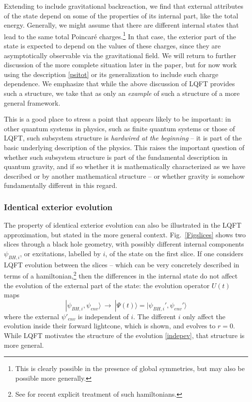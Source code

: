 \documentclass[11pt]{article}
\numberwithin{equation}{section}
\newcommand{\beq}{\begin{equation}}
\newcommand{\eeq}{\end{equation}}
\begin{document}
Extending to include gravitational backreaction, we find that external attributes of the state depend on some of the properties of its internal part, like the total energy.  Generally, we might assume that there are different internal states that lead to the same total Poincar\'e charges.\footnote{This is clearly possible in the presence of global symmetries, but may also be possible more generally.}  In that case, the exterior part of the state is expected to depend on the values of these charges, since they are asymptotically observable via the gravitational field\cite{DoGi4,SGsplit}.  We will return to further discussion of the more complete situation later in the paper, but for now work using the description \eqref{psitot} or its generalization to include such charge dependence.  We emphasize that while the above discussion of LQFT provides such a structure, we take that as only an {\it example} of such a structure of a more general framework.

This is a good place to stress a point that appears likely to be important: in other quantum systems in physics, such as finite quantum systems or those of LQFT, such subsystem structure is {\it hardwired at the beginning} -- it is part of the basic underlying description of the physics.  This raises the important question of whether such subsystem structure is part of the fundamental description in quantum gravity, and if so whether it is mathematically characterized as we have described or by another mathematical 
structure\cite{SGalg}\cite{QFG}\cite{DoGi4,SGsplit} -- or whether gravity is somehow fundamentally different in this regard.

\subsubsection{Identical exterior evolution}

The property of identical exterior evolution can also be illustrated in the LQFT approximation, but stated in the more general context.  Fig.~\ref{Figslices} shows two slices through a black hole geometry, with possibly different internal components $\psi_{BH,i}$, or excitations, labelled by $i$, of the state on the first slice.  If one considers LQFT evolution between the slices -- which can be very concretely described in terms of a hamiltonian,\footnote{See \cite{SGsch,SG2d,GiPe} for recent explicit treatment of such hamiltonians.} then the differences in the internal state do not affect the evolution of the external part of the state:  the evolution operator $U(t)$ maps 
\beq\label{indepev}
|\psi_{BH,i},\psi_{env}\rangle\ \rightarrow\ |\Psi(t)\rangle =|\psi_{BH,i}',\psi_{env}'\rangle
\eeq
where
the external $\psi'_{env}$ is independent of $i$.  The different $i$ only affect the evolution inside their forward lightcone, which is shown, and evolves to $r=0$.  While LQFT motivates the structure of the evolution \eqref{indepev}, that structure is more general.
\end{document}
